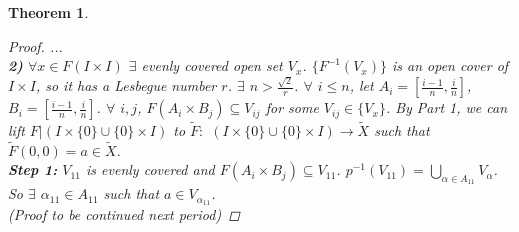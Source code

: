 \documentclass[11pt,reqno]{amsart}
\newtheorem{Theorem}{Theorem}
\theoremstyle{definition}
\begin{document}
\begin{Theorem}
\begin{proof}
    ...\\
    \textbf{2)} $\forall x \in F(I \times I)$ $\exists$ evenly covered open set $V_x$. $\{ F^{-1}(V_x) \}$ is an open cover of $I \times I$, so it has a Lesbegue number $r$. $\exists$ $n > \tfrac{\sqrt{2}}{r}$. $\forall$ $i \leq n$, let $A_i = [\tfrac{i-1}{n}, \tfrac{i}{n}]$, $B_i = [\tfrac{i-1}{n}, \tfrac{i}{n}]$. $\forall$ $i, j$, $F(A_i \times B_j) \subseteq V_{ij}$ for some $V_{ij} \in \{ V_x \}$. By Part 1, we can lift $F|(I \times \{ 0 \} \cup \{ 0 \} \times I)$ to $\widetilde{F} \colon$ $(I \times \{ 0 \} \cup \{ 0 \} \times I) \to \widetilde{X}$ such that $\widetilde{F}(0,0) = a \in \widetilde{X}$.\\
    \textbf{Step 1:} $V_{11}$ is evenly covered and $F(A_i \times B_j) \subseteq V_{11}$. $p^{-1}(V_{11}) = \bigcup_{\alpha \in A_{11}}V_{\alpha}$. So $\exists$ $\alpha_{11} \in A_{11}$ such that $a \in V_{\alpha_{11}}$.\\
    (Proof to be continued next period)
    \end{proof}
    \end{Theorem}
\end{document}
